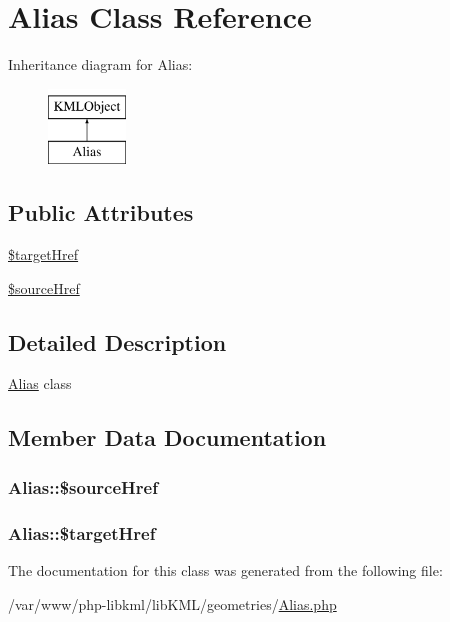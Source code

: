 \hypertarget{classAlias}{
\section{Alias Class Reference}
\label{d8/deb/classAlias}
}
Inheritance diagram for Alias:\begin{figure}[H]
\begin{center}
\leavevmode
\includegraphics[height=2.000000cm]{d8/deb/classAlias}
\end{center}
\end{figure}
\subsection*{Public Attributes}
\begin{DoxyCompactItemize}
\item 
\hyperlink{classAlias_a9766dd746aee11dbbfa2d4f7ed0287a9}{\$targetHref}
\item 
\hyperlink{classAlias_a364e0f8885fe18da12daddc903d39b7a}{\$sourceHref}
\end{DoxyCompactItemize}


\subsection{Detailed Description}
\hyperlink{classAlias}{Alias} class 

\subsection{Member Data Documentation}
\hypertarget{classAlias_a364e0f8885fe18da12daddc903d39b7a}{
\subsubsection[{\$sourceHref}]{\setlength{\rightskip}{0pt plus 5cm}Alias::\$sourceHref}}
\label{d8/deb/classAlias_a364e0f8885fe18da12daddc903d39b7a}
\hypertarget{classAlias_a9766dd746aee11dbbfa2d4f7ed0287a9}{
\subsubsection[{\$targetHref}]{\setlength{\rightskip}{0pt plus 5cm}Alias::\$targetHref}}
\label{d8/deb/classAlias_a9766dd746aee11dbbfa2d4f7ed0287a9}


The documentation for this class was generated from the following file:\begin{DoxyCompactItemize}
\item 
/var/www/php-\/libkml/libKML/geometries/\hyperlink{Alias_8php}{Alias.php}\end{DoxyCompactItemize}
